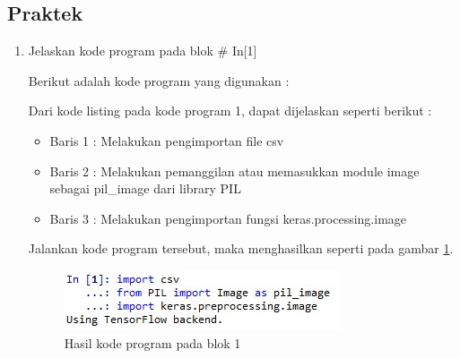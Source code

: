 \subsection{Praktek}
\begin{enumerate}
\item Jelaskan kode program pada blok \# In[1]
	\par Berikut adalah kode program yang digunakan :
	
	\par Dari kode listing pada kode program 1, dapat dijelaskan seperti berikut :
	\begin{itemize}
	\item Baris 1	: Melakukan pengimportan file csv
	\item Baris 2	: Melakukan pemanggilan atau memasukkan module image sebagai pil\_image dari library PIL
	\item Baris 3	: Melakukan pengimportan fungsi keras.processing.image 
	\end{itemize}
	\par Jalankan kode program tersebut, maka menghasilkan seperti pada gambar \ref{andri1}.
		\begin{figure}[!hbtp]
		\centering
		\includegraphics[scale=0.5]{figures/chapter7/andri1.jpg}
		\caption{Hasil kode program pada blok 1}
		\label{andri1}
		\end{figure}
	

\end{enumerate}
